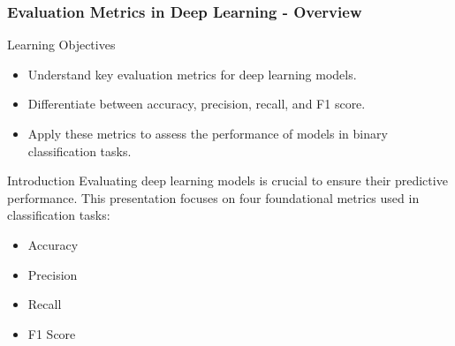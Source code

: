 \documentclass[aspectratio=169]{beamer}
\begin{document}
\begin{frame}[fragile]
    \frametitle{Evaluation Metrics in Deep Learning - Overview}
    \begin{block}{Learning Objectives}
        \begin{itemize}
            \item Understand key evaluation metrics for deep learning models.
            \item Differentiate between accuracy, precision, recall, and F1 score.
            \item Apply these metrics to assess the performance of models in binary classification tasks.
        \end{itemize}
    \end{block}

    \begin{block}{Introduction}
        Evaluating deep learning models is crucial to ensure their predictive performance. This presentation focuses on four foundational metrics used in classification tasks:
        \begin{itemize}
            \item Accuracy
            \item Precision
            \item Recall
            \item F1 Score
        \end{itemize}
    \end{block}
\end{frame}
\end{document}
